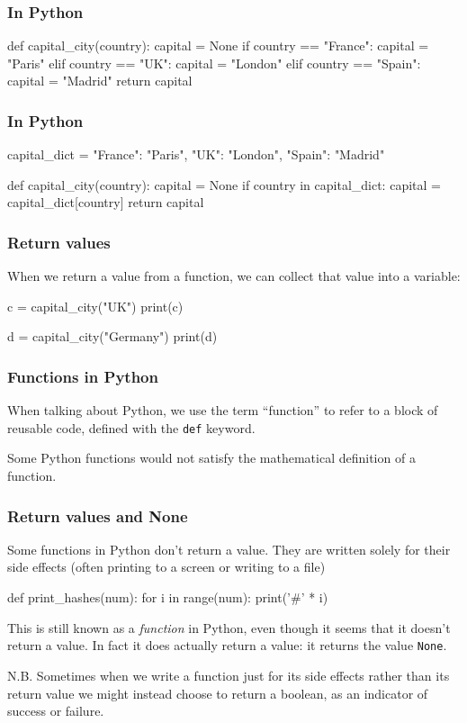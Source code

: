 \documentclass{beamer}
\begin{document}
\begin{frame}[fragile]
\frametitle{In Python}
\begin{code}
def capital_city(country):
   capital = None
   if country == "France":
      capital = "Paris"
   elif country == "UK":
      capital = "London"
   elif country == "Spain":
      capital = "Madrid"
   return capital
\end{code}
\end{frame}

\begin{frame}[fragile]
\frametitle{In Python}
\begin{code}
capital_dict = { 
  "France": "Paris", 
  "UK":     "London", 
  "Spain":  "Madrid" 
}

def capital_city(country):
   capital = None
   if country in capital_dict:
      capital = capital_dict[country]
   return capital
\end{code}
\end{frame}


\begin{frame}[fragile]
\frametitle{Return values}
When we return a value from a function, we can collect that value into
a variable:
\begin{code}
c = capital_city("UK")
print(c)

d = capital_city("Germany")
print(d) 
\end{code}
\end{frame}

\begin{frame}[fragile]
\frametitle{Functions in Python}
When talking about Python, we use the term ``function'' to refer to a block of
reusable code, defined with the \texttt{def} keyword. 

Some Python functions would not satisfy the mathematical definition of
a function. 
\end{frame}

\begin{frame}[fragile]
\frametitle{Return values and None}
Some functions in Python don't return a value. They are written
solely for their side effects (often printing to a screen or writing
to a file)
\begin{code}
def print_hashes(num):
   for i in range(num):
      print('#' * i)
\end{code}

This is still known as a {\em function} in Python, even though it seems
that it doesn't return a value. In fact it does actually return a
value: it returns the value \texttt{None}. 

\bigskip

N.B. Sometimes when we write a function just for its side effects rather than
its return value we might instead choose to return a boolean,
as an indicator of success or failure.
\end{frame}
\end{document}
